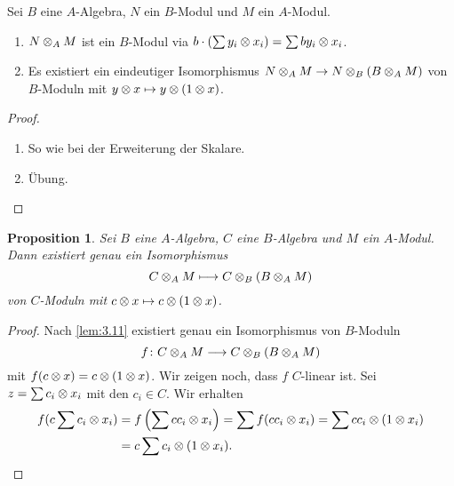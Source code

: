 \documentclass[12pt,a4paper]{scrartcl}
\theoremstyle{cplain}
\newtheorem{prop}[thmcounter]{Proposition}
\theoremstyle{cdef}
\begin{document}
\begin{lem} \label{lem:3.11}
	Sei $B$ eine $A$-Algebra, $N$ ein $B$-Modul und $M$ ein $A$-Modul.
	\begin{enumerate}
		\item $N\otimes_AM$ ist ein $B$-Modul via $b\cdot(\sum y_i\otimes x_i) = \sum by_i\otimes x_i$. \label{lem:311:i}
		\item Es existiert ein eindeutiger Isomorphismus $N\otimes_AM\to N\otimes_B(B\otimes_AM)$ von $B$-Moduln mit $y\otimes x\mapsto y\otimes (1\otimes x)$. \label{lem:311:ii}
	\end{enumerate}
\end{lem}
\begin{proof}
	\leavevmode
	\begin{enumerate}[label=\ref{lem:311:\roman*}]
		\item So wie bei der Erweiterung der Skalare.
		\item Übung. \qedhere
	\end{enumerate}
\end{proof}

\begin{prop} \label{prop:3.12}
	Sei $B$ eine $A$-Algebra, $C$ eine $B$-Algebra und $M$ ein $A$-Modul. Dann existiert genau ein Isomorphismus
	\[C\otimes_A M  \longmapsto  C\otimes_B(B\otimes_AM)\]
	von $C$-Moduln mit $c\otimes x\mapsto c\otimes(1\otimes x)$.
\end{prop}
\begin{proof}
	Nach \cref{lem:3.11} existiert genau ein Isomorphismus von $B$-Moduln
	\[ f\colon C\otimes_AM\longrightarrow C\otimes_B(B\otimes_AM)\]
	mit $f(c\otimes x) = c\otimes(1\otimes x)$. Wir zeigen noch, dass $f$ $C$-linear ist. Sei $z = \sum c_i\otimes x_i$ mit den $c_i\in C$. Wir erhalten
	\begin{align*}
		f(c\sum c_i\otimes x_i) &= f\left(\sum cc_i\otimes x_i \right) = \sum f(cc_i\otimes x_i) = \sum cc_i\otimes(1\otimes x_i) \\
		&= c\sum c_i\otimes(1\otimes x_i). \qedhere
	\end{align*}
\end{proof}
\end{document}
